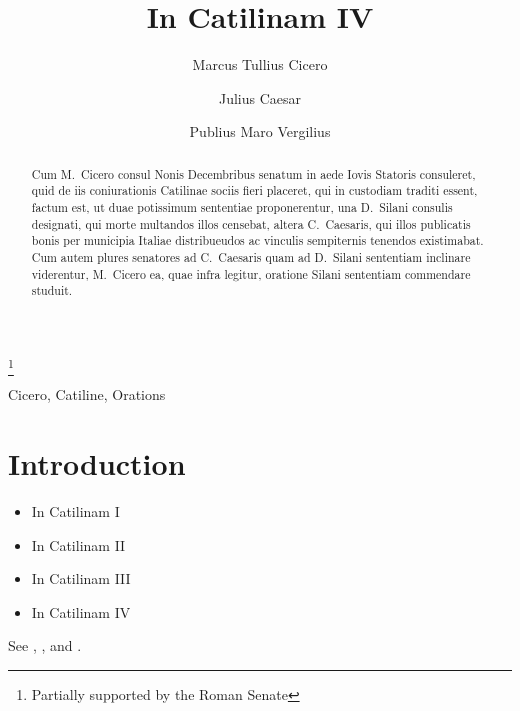 \documentclass{ifacmtg}
\begin{document}
\begin{frontmatter}
\title{In Catilinam IV}
\author[Paestum]{Marcus Tullius Cicero}
\author[Rome]{Julius Caesar}
\author[Baiae]{Publius Maro Vergilius}
\address[Paestum]{Buckingham Palace, Paestum}
\address[Rome]{Senate House, Rome}
\address[Baiae]{The White House, Baiae}
\thanks[Someone]{Partially supported by the Roman Senate}
\begin{abstract}
Cum M.~Cicero consul Nonis Decembribus senatum in aede
Iovis Statoris consuleret, quid de iis coniurationis Catilinae
sociis fieri placeret, qui in custodiam traditi essent, factum
est, ut duae potissimum sententiae proponerentur, una D.~Silani consulis
designati, qui morte multandos illos censebat,
altera C.~Caesaris, qui illos publicatis bonis per municipia
Italiae distribueudos ac vinculis sempiternis tenendos existimabat. Cum
autem plures senatores ad C.~Caesaris quam ad
D.~Silani sententiam inclinare viderentur, M.~Cicero ea, quae
infra legitur, oratione Silani sententiam commendare studuit.
\end{abstract}
\begin{keyword}
Cicero, Catiline, Orations
\end{keyword}
\end{frontmatter}

\section{Introduction}
\begin{itemize}
\item In Catilinam I
\item In Catilinam II
\item In Catilinam III
\item In Catilinam IV
\end{itemize}
See \cite{AbTaRu:54},  \cite{Abl:56}, \cite{Keo:58} and \cite{Pow:85}.
\end{document}
